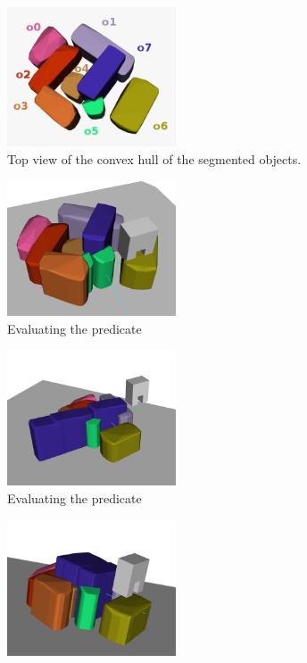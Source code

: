 \begin{figure}[h]
\centering
\begin{subfigure}[t]{5cm}
\centering
\includegraphics[width=5cm]{Img/block_dir/original_labels2.png}
\caption{Top view of the convex hull of the segmented objects.}\label{fig:block_dir_original}
\end{subfigure}
\begin{subfigure}[t]{5cm}
\centering
\includegraphics[width=5cm]{Img/block_dir/pushing11.png}
\caption{Evaluating the  predicate}\label{fig:block_dir_push1}
\end{subfigure}
\begin{subfigure}[t]{5cm}
\centering
\includegraphics[width=5cm]{Img/block_dir/pushing22.png}
\caption{Evaluating the  predicate}\label{fig:block_dir_original}
\end{subfigure}
\begin{subfigure}[t]{5cm}
\centering
\includegraphics[width=5cm]{Img/block_dir/pushing33.png}

\end{subfigure}
\end{figure}
